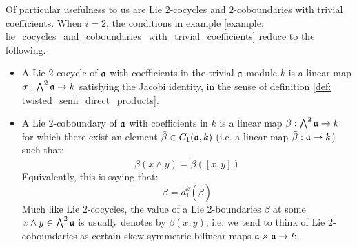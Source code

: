         \begin{example} \label{example: low_degree_lie_cocycles_and_coboundaries_with_trivial_coefficients}
            Of particular usefulness to us are Lie $2$-cocycles and $2$-coboundaries with trivial coefficients. When $i = 2$, the conditions in example \ref{example: lie_cocycles_and_coboundaries_with_trivial_coefficients} reduce to the following.
            \begin{itemize}
                \item A Lie $2$-cocycle of $\mathfrak{a}$ with coefficients in the trivial $\mathfrak{a}$-module $k$ is a linear map $\sigma: \bigwedge^2 \mathfrak{a} \to k$ satisfying the Jacobi identity, in the sense of definition \ref{def: twisted_semi_direct_products}.
                \item A Lie $2$-coboundary of $\mathfrak{a}$ with coefficients in $k$ is a linear map $\beta: \bigwedge^2 \mathfrak{a} \to k$ for which there exist an element $\tilde{\beta} \in C_1(\mathfrak{a}, k)$ (i.e. a linear map $\tilde{\beta}: \mathfrak{a} \to k$) such that:
                    $$\beta(x \wedge y) = \tilde{\beta}([x, y])$$
                Equivalently, this is saying that:
                    $$\beta = d_1^k(\tilde{\beta})$$
                Much like Lie $2$-cocycles, the value of a Lie $2$-boundaries $\beta$ at some $x \wedge y \in \bigwedge^2 \mathfrak{a}$ is usually denotes by $\beta(x, y)$, i.e. we tend to think of Lie $2$-coboundaries as certain skew-symmetric bilinear maps $\a \x \a \to k$.
            \end{itemize}
        \end{example}

